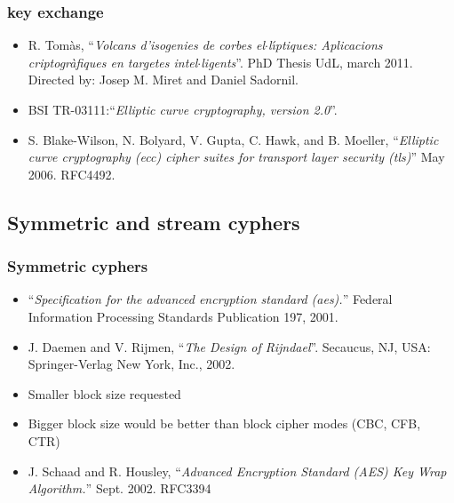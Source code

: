 \documentclass{beamer}
\begin{document}
\begin{frame}
\frametitle{key exchange}
    \begin{itemize}
        \item R. Tom\`as, ``\emph{Volcans d'isogenies de corbes el$\cdot$l\'{\i}ptiques: Aplicacions criptogr\`afiques en targetes intel$\cdot$ligents}''. PhD Thesis UdL, march 2011. Directed by: Josep M. Miret and Daniel Sadornil.\cite{Rosana11}
        \item BSI TR-03111:``\emph{Elliptic curve cryptography, version 2.0}''.\cite{BSI_TR-03111}
        \item S. Blake-Wilson, N. Bolyard, V. Gupta, C. Hawk, and B. Moeller, ``\emph{Elliptic curve cryptography (ecc) cipher suites for transport layer security (tls)}'' May 2006. RFC4492. \cite{rfc4492}

    \end{itemize}
\end{frame}

% 

\subsection{Symmetric and stream cyphers}

\begin{frame}
\frametitle{Symmetric cyphers}
    \begin{itemize}
        \item ``\emph{Specification for the advanced encryption standard (aes).}'' Federal Information Processing Standards Publication 197, 2001.\cite{AES-FIPS}
        \item J. Daemen and V. Rijmen, ``\emph{The Design of Rijndael}''. Secaucus, NJ, USA: Springer-Verlag New York, Inc., 2002. \cite{Daemen:2002:DR:560131}
        \item<1-|alert@1> Smaller block size requested
        \item<1-|alert@1> Bigger block size would be better than block cipher modes (CBC, CFB, CTR)
        \item J. Schaad and R. Housley, ``\emph{Advanced Encryption Standard (AES) Key Wrap Algorithm.}'' Sept. 2002. RFC3394 \cite{rfc3394}

    \end{itemize}
\end{frame}
\end{document}
